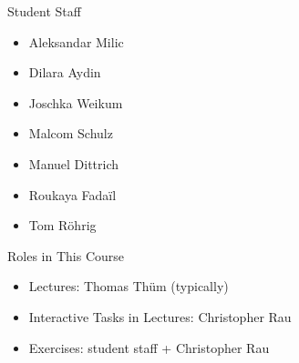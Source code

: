 \begin{frame}{\insertsubsection}
	\begin{fancycolumns}
		\begin{definition}{Student Staff}
			\begin{itemize}
				\item Aleksandar Milic
				\item Dilara Aydin
				\item Joschka Weikum
				\item Malcom Schulz
				\item Manuel Dittrich
				\item Roukaya Fada\"il
				\item Tom Röhrig
			\end{itemize}
		\end{definition}
	\nextcolumn
		\begin{note}{Roles in This Course}
			\begin{itemize}
				\item Lectures: Thomas Thüm (typically)
				\item Interactive Tasks in Lectures: Christopher Rau
				\item Exercises: student staff + Christopher Rau
			\end{itemize}
		\end{note}
	\end{fancycolumns}
\end{frame}
